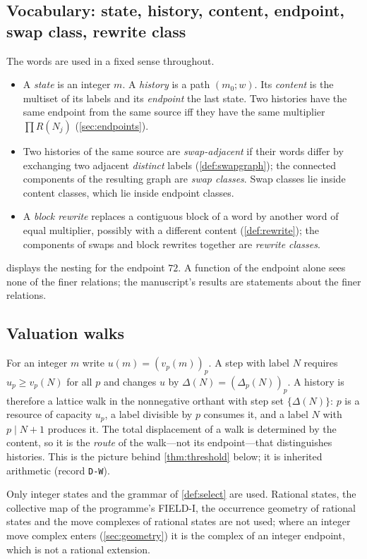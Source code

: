 \subsection{Vocabulary: state, history, content, endpoint, swap class, rewrite class}
The words are used in a fixed sense throughout.
\begin{itemize}[leftmargin=1.6em,itemsep=1pt]
\item A \emph{state} is an integer $m$. A \emph{history} is a path $(m_0;w)$. Its \emph{content} is the multiset of its labels and its \emph{endpoint} the last state. Two histories have the same endpoint from the same source iff they have the same multiplier $\prod R(N_j)$ (\cref{sec:endpoints}).
\item Two histories of the same source are \emph{swap-adjacent} if their words differ by exchanging two adjacent \emph{distinct} labels (\cref{def:swapgraph}); the connected components of the resulting graph are \emph{swap classes}. Swap classes lie inside content classes, which lie inside endpoint classes.
\item A \emph{block rewrite} replaces a contiguous block of a word by another word of equal multiplier, possibly with a different content (\cref{def:rewrite}); the components of swaps and block rewrites together are \emph{rewrite classes}.
\end{itemize}
 displays the nesting for the endpoint $72$. A function of the endpoint alone sees none of the finer relations; the manuscript's results are statements about the finer relations.

\subsection{Valuation walks}
For an integer $m$ write $u(m)=(v_p(m))_p$. A step with label $N$ requires $u_p\ge v_p(N)$ for all $p$ and changes $u$ by $\Delta(N)=(\Delta_p(N))_p$. A history is therefore a lattice walk in the nonnegative orthant with step set $\{\Delta(N)\}$: $p$ is a resource of capacity $u_p$, a label divisible by $p$ consumes it, and a label $N$ with $p\mid N+1$ produces it. The total displacement of a walk is determined by the content, so it is the \emph{route} of the walk---not its endpoint---that distinguishes histories. This is the picture behind \cref{thm:threshold} below; it is inherited arithmetic (record \texttt{D-W}).

\begin{remark}\label{rem:bounds}
Only integer states and the grammar of \cref{def:select} are used. Rational states, the collective map of the programme's FIELD-I, the occurrence geometry of rational states and the move complexes of rational states are not used; where an integer move complex enters (\cref{sec:geometry}) it is the complex of an integer endpoint, which is not a rational extension.
\end{remark}
